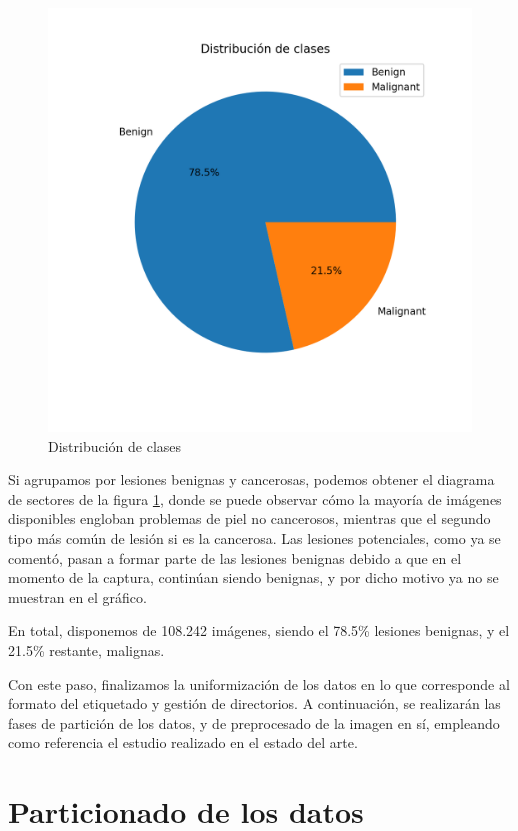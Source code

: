 \begin{figure}[H]
	\centering
	\includegraphics[scale = 0.525]{imagenes/graficotarta.png}
	\caption{Distribución de clases}
		\label {tartabinaria}
\end{figure}

Si agrupamos por lesiones benignas y cancerosas, podemos obtener el diagrama de sectores de la figura \ref{tartabinaria}, donde se puede observar cómo la mayoría de imágenes disponibles engloban problemas de piel no cancerosos, mientras que el segundo tipo más común de lesión si es la cancerosa. Las lesiones potenciales, como ya se comentó, pasan a formar parte de las lesiones benignas debido a que en el momento de la captura, continúan siendo benignas, y por dicho motivo ya no se muestran en el gráfico.

En total, disponemos de 108.242 imágenes, siendo el 78.5\% lesiones benignas, y el 21.5\% restante, malignas.

Con este paso, finalizamos la uniformización de los datos en lo que corresponde al formato del etiquetado y gestión de directorios. A continuación, se realizarán las fases de partición de los datos, y de preprocesado de la imagen en sí, empleando como referencia el estudio realizado en el estado del arte.


\section{Particionado de los datos}

